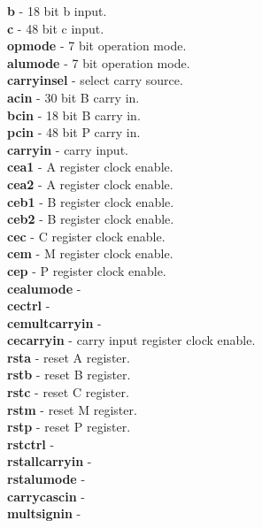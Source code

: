             {\bf b} - 18 bit b input.\\
            {\bf c} - 48 bit c input.\\
            {\bf opmode} - 7 bit operation mode. \\
            {\bf alumode} - 7 bit operation mode. \\
            {\bf carryinsel} - select carry source. \\
            {\bf acin} - 30 bit B carry in. \\
            {\bf bcin} - 18 bit B carry in. \\
            {\bf pcin} - 48 bit P carry in. \\
            {\bf carryin} - carry input. \\            
            {\bf cea1} - A register clock enable. \\
            {\bf cea2} - A register clock enable. \\
            {\bf ceb1} - B register clock enable. \\
            {\bf ceb2} - B register clock enable. \\
            {\bf cec} - C register clock enable. \\
            {\bf cem} - M register clock enable. \\
            {\bf cep} - P register clock enable. \\
            {\bf cealumode} -  \\
            {\bf cectrl} -  \\
            {\bf cemultcarryin} -  \\
            {\bf cecarryin} - carry input register clock enable. \\
            {\bf rsta} - reset A register. \\
            {\bf rstb} - reset B register. \\
            {\bf rstc} - reset C register. \\
            {\bf rstm} - reset M register. \\
            {\bf rstp} - reset P register. \\
            {\bf rstctrl} -  \\
            {\bf rstallcarryin} -  \\
            {\bf rstalumode} -  \\
            {\bf carrycascin} -  \\
            {\bf multsignin} -    \\       

